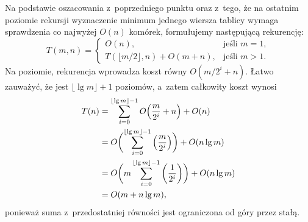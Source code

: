 \subproblem %
Na podstawie oszacowania z~poprzedniego punktu oraz z~tego, że na ostatnim poziomie rekursji wyznaczenie minimum jednego wiersza tablicy wymaga sprawdzenia co najwyżej $O(n)$ komórek, formułujemy następującą rekurencję:
\[
	T(m,n) =
	\begin{cases}
		O(n), & \text{jeśli $m=1$}, \\
		T(\lfloor m/2\rfloor,n)+O(m+n), & \text{jeśli $m>1$}.
	\end{cases}
\]
Na  poziomie, rekurencja wprowadza koszt równy $O(m/2^i+n)$. Łatwo zauważyć, że jest $\lfloor\lg m\rfloor+1$ poziomów, a~zatem całkowity koszt wynosi
\begin{align*}
	T(n) &= \sum_{i=0}^{\lfloor\lg m\rfloor-1}O\Bigl(\frac{m}{2^i}+n\Bigr)+O(n) \\
	&= O\biggl(\sum_{i=0}^{\lfloor\lg m\rfloor-1}\left(\frac{m}{2^i}\right)\biggr)+O(n\lg m) \\
	&= O\biggl(m\sum_{i=0}^{\lfloor\lg m\rfloor-1}\left(\frac{1}{2^i}\right)\biggr)+O(n\lg m) \\
	&= O(m+n\lg m),
\end{align*}
ponieważ suma z~przedostatniej równości jest ograniczona od góry przez stałą.

\endinput
